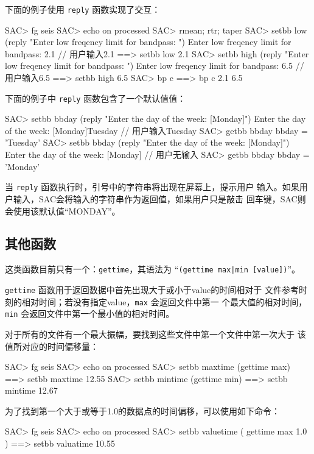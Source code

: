 下面的例子使用 \texttt{reply} 函数实现了交互：
\begin{SACCode}
SAC> fg seis
SAC> echo on processed
SAC> rmean; rtr; taper
SAC> setbb low (reply "Enter low freqency limit for bandpass: ")
Enter low freqency limit for bandpass: 2.1          // 用户输入2.1
 ==>  setbb low 2.1
SAC> setbb high (reply "Enter low freqency limit for bandpass: ")
Enter low freqency limit for bandpass: 6.5          // 用户输入6.5
 ==>  setbb high 6.5
SAC> bp c %
 ==>  bp c 2.1 6.5
\end{SACCode}

下面的例子中 \texttt{reply} 函数包含了一个默认值值：
\begin{SACCode}
SAC> setbb bbday (reply "Enter the day of the week: [Monday]")
Enter the day of the week: [Monday]Tuesday      // 用户输入Tuesday
SAC> getbb bbday
 bbday = 'Tuesday'
SAC> setbb bbday (reply "Enter the day of the week: [Monday]")
Enter the day of the week: [Monday]             // 用户无输入
SAC> getbb bbday
 bbday = 'Monday'
\end{SACCode}
当 \texttt{reply} 函数执行时，引号中的字符串将出现在屏幕上，提示用户
输入。如果用户输入，SAC会将输入的字符串作为返回值，如果用户只是敲击
回车键，SAC则会使用该默认值``MONDAY''。

\subsection{其他函数}
这类函数目前只有一个：\texttt{gettime}，其语法为
``\texttt{(gettime max|min [value])}''。

\texttt{gettime} 函数用于返回数据中首先出现大于或小于value的时间相对于
文件参考时刻的相对时间；若没有指定value，\texttt{max} 会返回文件中第一
个最大值的相对时间，\texttt{min} 会返回文件中第一个最小值的相对时间。

对于所有的文件有一个最大振幅，要找到这些文件中第一个文件中第一次大于
该值所对应的时间偏移量：
\begin{SACCode}
SAC> fg seis
SAC> echo on processed
SAC> setbb maxtime (gettime max)
 ==>  setbb maxtime 12.55
SAC> setbb mintime (gettime min)
 ==>  setbb mintime 12.67
\end{SACCode}

为了找到第一个大于或等于1.0的数据点的时间偏移，可以使用如下命令：
\begin{SACCode}
SAC> fg seis
SAC> echo on processed
SAC> setbb valuetime ( gettime max 1.0 )
 ==> setbb valuatime 10.55
\end{SACCode}
